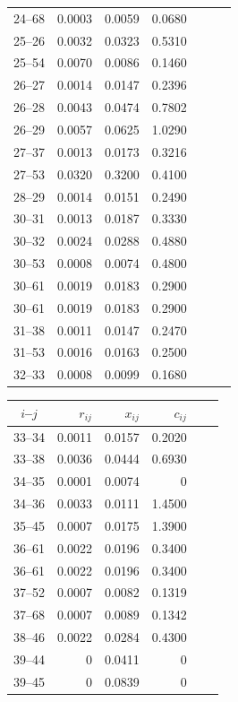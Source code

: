 \documentclass[tombow,dvipdfmx]{corona-a5-1.1}
\begin{document}
\begin{table}[h]
{\begin{minipage}{0.49\linewidth}
\begin{tabular}{crrrrcc}
24--68  & 0.0003 & 0.0059 & 0.0680 \\
25--26  & 0.0032 & 0.0323 & 0.5310 \\
25--54  & 0.0070 & 0.0086 & 0.1460 \\
26--27  & 0.0014 & 0.0147 & 0.2396 \\
26--28  & 0.0043 & 0.0474 & 0.7802 \\
26--29  & 0.0057 & 0.0625 & 1.0290 \\
27--37  & 0.0013 & 0.0173 & 0.3216 \\
27--53  & 0.0320 & 0.3200 & 0.4100 \\
28--29  & 0.0014 & 0.0151 & 0.2490 \\
30--31  & 0.0013 & 0.0187 & 0.3330 \\
30--32  & 0.0024 & 0.0288 & 0.4880 \\
30--53  & 0.0008 & 0.0074 & 0.4800 \\
30--61  & 0.0019 & 0.0183 & 0.2900 \\
30--61  & 0.0019 & 0.0183 & 0.2900 \\
31--38  & 0.0011 & 0.0147 & 0.2470 \\
31--53  & 0.0016 & 0.0163 & 0.2500 \\
32--33  & 0.0008 & 0.0099 & 0.1680 \\
\hline
  \end{tabular}
  \end{minipage}
  \begin{minipage}{0.49\linewidth}
    \centering
  \begin{tabular}{crrrcc}
   \hline
$i$--$j$ & $r_{ij}$  &  $x_{ij}$ & $c_{ij}$ \\
   \hline \hline
33--34  & 0.0011 & 0.0157 & 0.2020 \\
33--38  & 0.0036 & 0.0444 & 0.6930 \\
34--35  & 0.0001 & 0.0074 & 0 \\
34--36  & 0.0033 & 0.0111 & 1.4500 \\
35--45  & 0.0007 & 0.0175 & 1.3900 \\
36--61  & 0.0022 & 0.0196 & 0.3400 \\
36--61  & 0.0022 & 0.0196 & 0.3400 \\
37--52  & 0.0007 & 0.0082 & 0.1319 \\
37--68  & 0.0007 & 0.0089 & 0.1342 \\
38--46  & 0.0022 & 0.0284 & 0.4300 \\
39--44  & 0 & 0.0411 & 0 \\
39--45  & 0 & 0.0839 & 0 \\

\end{tabular}
\end{minipage}}
\end{table}
\end{document}
